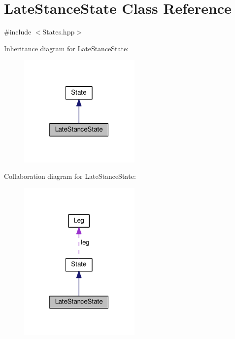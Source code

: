 \hypertarget{classLateStanceState}{}\section{Late\+Stance\+State Class Reference}
\label{classLateStanceState}


{\ttfamily \#include $<$States.\+hpp$>$}



Inheritance diagram for Late\+Stance\+State\+:\nopagebreak
\begin{figure}[H]
\begin{center}
\leavevmode
\includegraphics[width=169pt]{classLateStanceState__inherit__graph}
\end{center}
\end{figure}


Collaboration diagram for Late\+Stance\+State\+:
\nopagebreak
\begin{figure}[H]
\begin{center}
\leavevmode
\includegraphics[width=169pt]{classLateStanceState__coll__graph}
\end{center}
\end{figure}
